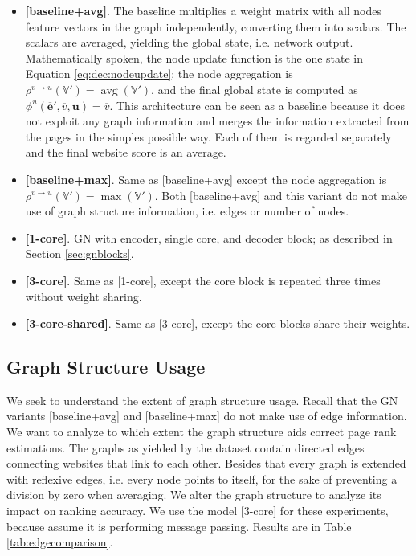 \begin{itemize}
    \item \textbf{[baseline+avg]}. The baseline multiplies a weight matrix with all nodes feature vectors in the graph independently, converting them into scalars. The scalars are averaged, yielding the global state, i.e. network output. Mathematically spoken, the node update function is the one state in Equation \ref{eq:dec:nodeupdate}; the node aggregation is $\rho^{v\rightarrow u}\left(\mathbb{V}'\right)=\operatorname{avg}\left(\mathbb{V}'\right)$, and the final global state is computed as $\phi^u\left(\bm{\overline{e}}',\overline{v},\bm{u}\right)=\overline{v}$. This architecture can be seen as a baseline because it does not exploit any graph information and merges the information extracted from the pages in the simples possible way. Each of them is regarded separately and the final website score is an average.
    \item \textbf{[baseline+max]}. Same as [baseline+avg] except the node aggregation is $\rho^{v\rightarrow u}\left(\mathbb{V}'\right)=\operatorname{max}\left(\mathbb{V}'\right)$. Both [baseline+avg] and this variant do not make use of graph structure information, i.e. edges or number of nodes.
    \item \textbf{[1-core]}. GN with encoder, single core, and decoder block; as described in Section \ref{sec:gnblocks}.
    \item \textbf{[3-core]}. Same as [1-core], except the core block is repeated three times without weight sharing.
    \item \textbf{[3-core-shared]}. Same as [3-core], except the core blocks share their weights.
\end{itemize}

\subsection{Graph Structure Usage}

We seek to understand the extent of graph structure usage. Recall that the GN variants [baseline+avg] and [baseline+max] do not make use of edge information. We want to analyze to which extent the graph structure aids correct page rank estimations. The graphs as yielded by the dataset contain directed edges connecting websites that link to each other. Besides that every graph is extended with reflexive edges, i.e. every node points to itself, for the sake of preventing a division by zero when averaging. We alter the graph structure to analyze its impact on ranking accuracy. We use the model [3-core] for these experiments, because assume it is performing message passing. Results are in Table \ref{tab:edgecomparison}.

